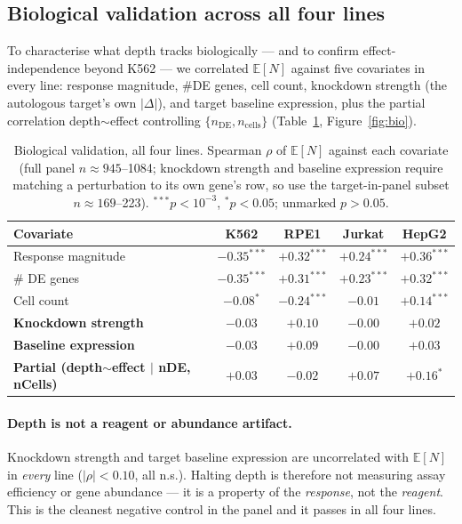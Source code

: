 \documentclass[11pt]{article}
\newcommand{\EN}{\ensuremath{\mathbb{E}[N]}}
\let\mathrho\rho
\renewcommand{\rho}{\ensuremath{\mathrho}}
\begin{document}
\subsection{Biological validation across all four lines}
\label{sec:biology}

To characterise what depth tracks biologically --- and to confirm effect-independence beyond
K562 --- we correlated \EN{} against five covariates in every line: response magnitude, \#DE
genes, cell count, knockdown strength (the autologous target's own $|\Delta|$), and target
baseline expression, plus the partial correlation depth$\sim$effect controlling
$\{n_{\text{DE}}, n_{\text{cells}}\}$ (Table~\ref{tab:biology}, Figure~\ref{fig:bio}).

\begin{table}[t]
\centering
\caption{Biological validation, all four lines. Spearman \rho{} of \EN{} against each covariate
(full panel $n\approx945$--1084; knockdown strength and baseline expression require matching a
perturbation to its own gene's row, so use the target-in-panel subset $n\approx169$--223).
$^{***}p<10^{-3}$, $^{*}p<0.05$; unmarked $p>0.05$.}
\label{tab:biology}
\begin{tabular}{lcccc}
\toprule
\textbf{Covariate} & \textbf{K562} & \textbf{RPE1} & \textbf{Jurkat} & \textbf{HepG2} \\
\midrule
Response magnitude & $-0.35^{***}$ & $+0.32^{***}$ & $+0.24^{***}$ & $+0.36^{***}$ \\
\# DE genes        & $-0.35^{***}$ & $+0.31^{***}$ & $+0.23^{***}$ & $+0.32^{***}$ \\
Cell count         & $-0.08^{*}$   & $-0.24^{***}$ & $-0.01$       & $+0.14^{***}$ \\
\textbf{Knockdown strength} & $-0.03$ & $+0.10$ & $-0.00$ & $+0.02$ \\
\textbf{Baseline expression} & $-0.03$ & $+0.09$ & $-0.00$ & $+0.03$ \\
\textbf{Partial (depth$\sim$effect $\mid$ nDE, nCells)} & $+0.03$ & $-0.02$ & $+0.07$ & $+0.16^{*}$ \\
\bottomrule
\end{tabular}
\end{table}

\paragraph{Depth is not a reagent or abundance artifact.} Knockdown strength and target baseline
expression are uncorrelated with \EN{} in \emph{every} line ($|\rho|<0.10$, all n.s.). Halting
depth is therefore not measuring assay efficiency or gene abundance --- it is a property of the
\emph{response}, not the \emph{reagent}. This is the cleanest negative control in the panel and it
passes in all four lines.
\end{document}
